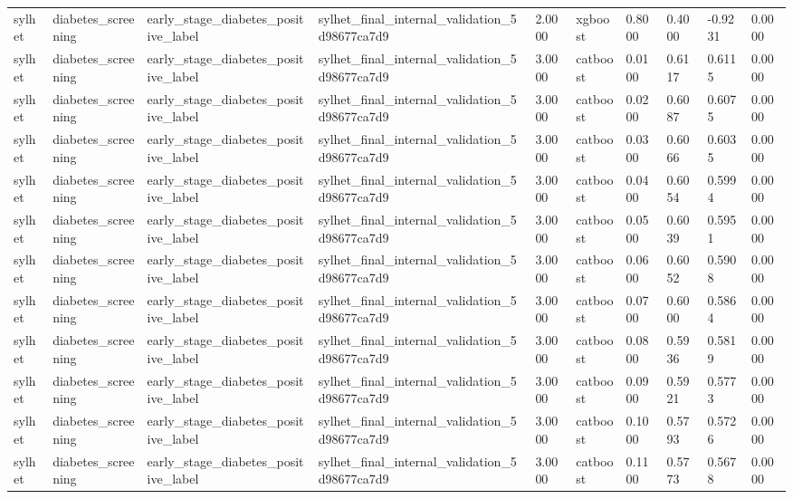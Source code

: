 \begin{tabular}{llllllllll}
sylhet & diabetes\_screening & early\_stage\_diabetes\_positive\_label & sylhet\_final\_internal\_validation\_5d98677ca7d9 & 2.0000 & xgboost & 0.8000 & 0.4000 & -0.9231 & 0.0000 \\
sylhet & diabetes\_screening & early\_stage\_diabetes\_positive\_label & sylhet\_final\_internal\_validation\_5d98677ca7d9 & 3.0000 & catboost & 0.0100 & 0.6117 & 0.6115 & 0.0000 \\
sylhet & diabetes\_screening & early\_stage\_diabetes\_positive\_label & sylhet\_final\_internal\_validation\_5d98677ca7d9 & 3.0000 & catboost & 0.0200 & 0.6087 & 0.6075 & 0.0000 \\
sylhet & diabetes\_screening & early\_stage\_diabetes\_positive\_label & sylhet\_final\_internal\_validation\_5d98677ca7d9 & 3.0000 & catboost & 0.0300 & 0.6066 & 0.6035 & 0.0000 \\
sylhet & diabetes\_screening & early\_stage\_diabetes\_positive\_label & sylhet\_final\_internal\_validation\_5d98677ca7d9 & 3.0000 & catboost & 0.0400 & 0.6054 & 0.5994 & 0.0000 \\
sylhet & diabetes\_screening & early\_stage\_diabetes\_positive\_label & sylhet\_final\_internal\_validation\_5d98677ca7d9 & 3.0000 & catboost & 0.0500 & 0.6039 & 0.5951 & 0.0000 \\
sylhet & diabetes\_screening & early\_stage\_diabetes\_positive\_label & sylhet\_final\_internal\_validation\_5d98677ca7d9 & 3.0000 & catboost & 0.0600 & 0.6052 & 0.5908 & 0.0000 \\
sylhet & diabetes\_screening & early\_stage\_diabetes\_positive\_label & sylhet\_final\_internal\_validation\_5d98677ca7d9 & 3.0000 & catboost & 0.0700 & 0.6000 & 0.5864 & 0.0000 \\
sylhet & diabetes\_screening & early\_stage\_diabetes\_positive\_label & sylhet\_final\_internal\_validation\_5d98677ca7d9 & 3.0000 & catboost & 0.0800 & 0.5936 & 0.5819 & 0.0000 \\
sylhet & diabetes\_screening & early\_stage\_diabetes\_positive\_label & sylhet\_final\_internal\_validation\_5d98677ca7d9 & 3.0000 & catboost & 0.0900 & 0.5921 & 0.5773 & 0.0000 \\
sylhet & diabetes\_screening & early\_stage\_diabetes\_positive\_label & sylhet\_final\_internal\_validation\_5d98677ca7d9 & 3.0000 & catboost & 0.1000 & 0.5793 & 0.5726 & 0.0000 \\
sylhet & diabetes\_screening & early\_stage\_diabetes\_positive\_label & sylhet\_final\_internal\_validation\_5d98677ca7d9 & 3.0000 & catboost & 0.1100 & 0.5773 & 0.5678 & 0.0000 \\

\end{tabular}
